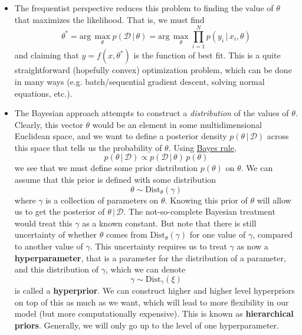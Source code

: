   \begin{itemize}
    \item The frequentist perspective reduces this problem to finding the value of $\theta$ that maximizes the likelihood. That is, we must find
    \begin{equation}
      \theta^* = \text{arg}\, \max_{\theta} p(\mathcal{D}\,|\,\theta) = \text{arg}\, \max_{\theta} \prod_{i=1}^N p(y_i \,|\,x_i, \theta)
    \end{equation}
    and claiming that $y = f(x, \theta^*)$ is the function of best fit. This is a quite straightforward (hopefully convex) optimization problem, which can be done in many ways (e.g. batch/sequential gradient descent, solving normal equations, etc.).

    \item The Bayesian approach attempts to construct a \textit{distribution} of the values of $\theta$. Clearly, this vector $\theta$ would be an element in some multidimensional Euclidean space, and we want to define a posterior density $p(\theta\,|\,\mathcal{D})$ across this space that tells us the probability of $\theta$. Using \hyperref[prob-thm:bayes-rule]{Bayes rule},
    \begin{equation}
      p(\theta\,|\,\mathcal{D}) \propto p(\mathcal{D}\,|\,\theta) \, p(\theta)
    \end{equation}
    we see that we must define some prior distribution $p(\theta)$ on $\theta$. We can assume that this prior is defined with some distribution
    \begin{equation}
      \theta \sim \text{Dist}_\theta (\gamma)
    \end{equation}
    where $\gamma$ is a collection of parameters on $\theta$. Knowing this prior of $\theta$ will allow us to get the posterior of $\theta\,|\,\mathcal{D}$. The not-so-complete Bayesian treatment would treat this $\gamma$ as a known constant. But note that there is still uncertainty of whether $\theta$ comes from $\text{Dist}_\theta (\gamma)$ for one value of $\gamma$, compared to another value of $\gamma$. This uncertainty requires us to treat $\gamma$ as now a \textbf{hyperparameter}, that is a parameter for the distribution of a parameter, and this distribution of $\gamma$, which we can denote
    \begin{equation}
      \gamma \sim \text{Dist}_\gamma (\xi)
    \end{equation}
    is called a \textbf{hyperprior}. We can construct higher and higher level hyperpriors on top of this as much as we want, which will lead to more flexibility in our model (but more computationally expensive). This is known as \textbf{hierarchical priors}. Generally, we will only go up to the level of one hyperparameter.
  \end{itemize}

